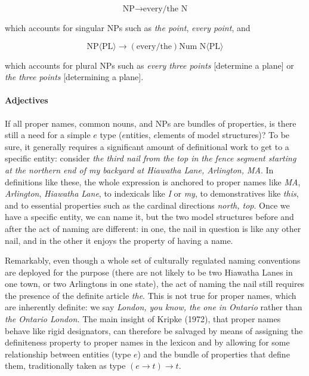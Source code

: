 \begin{equation}
\text{NP} \rightarrow \text{every/the}  \text{ N}
\end{equation}

\noindent
which accounts for singular NPs such as {\it the point}, {\it every point},
and

\begin{equation}
\text{NP}\langle\text{PL}\rangle \rightarrow (\text{every/the}) \text{
  Num} \text{ N}\langle\text{PL}\rangle
\end{equation}

\noindent
which accounts for plural NPs such as {\it every three points} [determine a
plane] or {\it the three points} [determining a plane]. 

\paragraph*{Adjectives}

If all proper names, common nouns, and NPs are bundles of properties, is there
still a need for a simple $e$ type ($e$ntities, $e$lements of model
structures)?  To be sure, it generally requires a significant amount of
definitional work to get to a specific entity: consider {\it the third nail
  from the top in the fence segment starting at the northern end of my
  backyard at Hiawatha Lane, Arlington, MA}. In definitions like these, the
whole expression is anchored to proper names like {\it MA}, {\it Arlington},
{\it Hiawatha Lane}, to indexicals like {\it I} or {\it my}, to demonstratives
like {\it this}, and to essential properties such as the cardinal directions
{\it north, top}.  Once we have a specific entity, we can name it, but the two
model structures before and after the act of naming are different: in one, the
nail in question is like any other nail, and in the other it enjoys the
property of having a name.

Remarkably, even though a whole set of culturally regulated naming conventions
are deployed for the purpose (there are not likely to be two Hiawatha Lanes in
one town, or two Arlingtons in one state), the act of naming the nail still
requires the presence of the definite article {\it the}. This is not true for
proper names, which are inherently definite: we say {\it London, you know, the
  one in Ontario} rather than {\it *the Ontario London.} The main insight of
Kripke (1972), that proper names behave like rigid designators, can therefore
be salvaged by means of assigning the definiteness property to proper names in
the lexicon and by allowing for some relationship between entities (type $e$)
and the bundle of properties that define them, traditionally taken as type $(e
\rightarrow t) \rightarrow t$.

